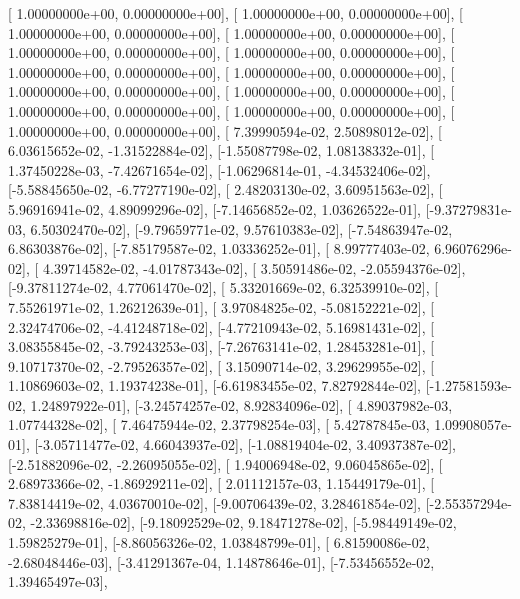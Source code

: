 \documentclass{article}
\begin{document}
       [ 1.00000000e+00,  0.00000000e+00],
       [ 1.00000000e+00,  0.00000000e+00],
       [ 1.00000000e+00,  0.00000000e+00],
       [ 1.00000000e+00,  0.00000000e+00],
       [ 1.00000000e+00,  0.00000000e+00],
       [ 1.00000000e+00,  0.00000000e+00],
       [ 1.00000000e+00,  0.00000000e+00],
       [ 1.00000000e+00,  0.00000000e+00],
       [ 1.00000000e+00,  0.00000000e+00],
       [ 1.00000000e+00,  0.00000000e+00],
       [ 1.00000000e+00,  0.00000000e+00],
       [ 1.00000000e+00,  0.00000000e+00],
       [ 1.00000000e+00,  0.00000000e+00],
       [ 7.39990594e-02,  2.50898012e-02],
       [ 6.03615652e-02, -1.31522884e-02],
       [-1.55087798e-02,  1.08138332e-01],
       [ 1.37450228e-03, -7.42671654e-02],
       [-1.06296814e-01, -4.34532406e-02],
       [-5.58845650e-02, -6.77277190e-02],
       [ 2.48203130e-02,  3.60951563e-02],
       [ 5.96916941e-02,  4.89099296e-02],
       [-7.14656852e-02,  1.03626522e-01],
       [-9.37279831e-03,  6.50302470e-02],
       [-9.79659771e-02,  9.57610383e-02],
       [-7.54863947e-02,  6.86303876e-02],
       [-7.85179587e-02,  1.03336252e-01],
       [ 8.99777403e-02,  6.96076296e-02],
       [ 4.39714582e-02, -4.01787343e-02],
       [ 3.50591486e-02, -2.05594376e-02],
       [-9.37811274e-02,  4.77061470e-02],
       [ 5.33201669e-02,  6.32539910e-02],
       [ 7.55261971e-02,  1.26212639e-01],
       [ 3.97084825e-02, -5.08152221e-02],
       [ 2.32474706e-02, -4.41248718e-02],
       [-4.77210943e-02,  5.16981431e-02],
       [ 3.08355845e-02, -3.79243253e-03],
       [-7.26763141e-02,  1.28453281e-01],
       [ 9.10717370e-02, -2.79526357e-02],
       [ 3.15090714e-02,  3.29629955e-02],
       [ 1.10869603e-02,  1.19374238e-01],
       [-6.61983455e-02,  7.82792844e-02],
       [-1.27581593e-02,  1.24897922e-01],
       [-3.24574257e-02,  8.92834096e-02],
       [ 4.89037982e-03,  1.07744328e-02],
       [ 7.46475944e-02,  2.37798254e-03],
       [ 5.42787845e-03,  1.09908057e-01],
       [-3.05711477e-02,  4.66043937e-02],
       [-1.08819404e-02,  3.40937387e-02],
       [-2.51882096e-02, -2.26095055e-02],
       [ 1.94006948e-02,  9.06045865e-02],
       [ 2.68973366e-02, -1.86929211e-02],
       [ 2.01112157e-03,  1.15449179e-01],
       [ 7.83814419e-02,  4.03670010e-02],
       [-9.00706439e-02,  3.28461854e-02],
       [-2.55357294e-02, -2.33698816e-02],
       [-9.18092529e-02,  9.18471278e-02],
       [-5.98449149e-02,  1.59825279e-01],
       [-8.86056326e-02,  1.03848799e-01],
       [ 6.81590086e-02, -2.68048446e-03],
       [-3.41291367e-04,  1.14878646e-01],
       [-7.53456552e-02,  1.39465497e-03],
\end{document}
